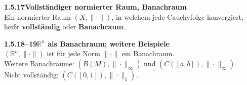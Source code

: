 \documentclass[a4paper,12pt]{article}
\newcommand{\gentry}[3]{%
  \noindent\textbf{#1\quad #2}\nopagebreak\\[0.2em]
  #3\par\smallskip
}
\begin{document}
\gentry{1.5.17}{Vollständiger normierter Raum, Banachraum}{%
  Ein normierter Raum $(X, \|\cdot\|)$, in welchem jede Cauchyfolge konvergiert,
  heißt \textbf{vollständig} oder \textbf{Banachraum}.
}

\gentry{1.5.18--19}{$\mathbb{R}^n$ als Banachraum; weitere Beispiele}{%
  $({\mathbb{R}^n}, \|\cdot\|)$ ist für jede Norm $\|\cdot\|$ ein Banachraum.\\
  Weitere Banachräume: $(B(M), \|\cdot\|_\infty)$ und $(C([a,b]), \|\cdot\|_\infty)$.\\
  Nicht vollständig: $(C([0,1]), \|\cdot\|_1)$.
}
\end{document}
